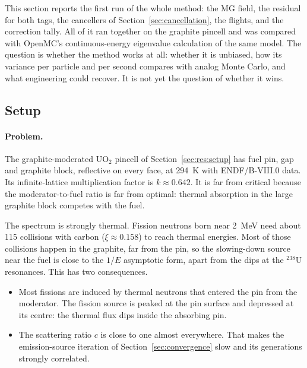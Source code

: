 


This section reports the first run of the whole method: the MG field, the residual for both tags, the
cancellers of Section~\ref{sec:cancellation}, the flights, and the correction tally. All of it ran
together on the graphite pincell and was compared with OpenMC's continuous-energy eigenvalue
calculation of the same model. The question is whether the method works at all: whether it is
unbiased, how its variance per particle and per second compares with analog Monte Carlo, and what
engineering could recover. It is not yet the question of whether it wins.

\subsection{Setup}

\paragraph{Problem.} The graphite-moderated UO$_2$ pincell of Section~\ref{sec:res:setup} has fuel
pin, gap and graphite block, reflective on every face, at 294~K with ENDF/B-VIII.0 data. Its
infinite-lattice multiplication factor is $k\approx0.642$. It is far from critical because the
moderator-to-fuel ratio is far from optimal: thermal absorption in the large graphite block competes
with the fuel.

The spectrum is strongly thermal. Fission neutrons born near 2~MeV need about 115 collisions with
carbon ($\xi\approx0.158$) to reach thermal energies. Most of those collisions happen in the
graphite, far from the pin, so the slowing-down source near the fuel is close to the
$1/E$ asymptotic form, apart from the dips at the $^{238}$U resonances. This has two consequences.
\begin{itemize}
\item Most fissions are induced by thermal neutrons that entered the pin from the moderator. The
  fission source is peaked at the pin surface and depressed at its centre: the thermal flux dips
  inside the absorbing pin.
\item The scattering ratio $c$ is close to one almost everywhere. That makes the emission-source
  iteration of Section~\ref{sec:convergence} slow and its generations strongly correlated.
\end{itemize}

